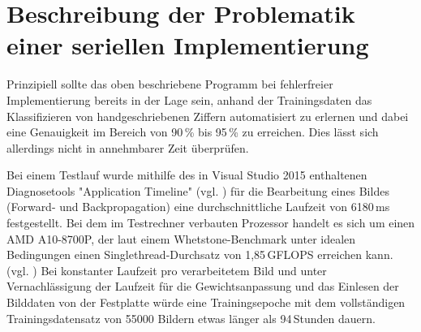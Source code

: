 \documentclass[../main.tex]{subfiles}
\begin{document}
\section{Beschreibung der Problematik einer seriellen Implementierung}
Prinzipiell sollte das oben beschriebene Programm bei fehlerfreier Implementierung bereits in der Lage sein, anhand der Trainingsdaten das Klassifizieren von handgeschriebenen Ziffern automatisiert zu erlernen und dabei eine Genauigkeit im Bereich von 90\,\% bis 95\,\% zu erreichen. Dies lässt sich allerdings nicht in annehmbarer Zeit überprüfen. 

Bei einem Testlauf wurde mithilfe des in Visual Studio 2015 enthaltenen Diagnosetools "Application Timeline" (vgl. \cite{msVsDiagnosisBlog}) für die Bearbeitung eines Bildes (Forward- und Backpropagation) eine durchschnittliche Laufzeit von 6180\,ms festgestellt. Bei dem im Testrechner verbauten Prozessor handelt es sich um einen AMD A10-8700P, der laut einem Whetstone-Benchmark unter idealen Bedingungen einen Singlethread-Durchsatz von 1,85\,GFLOPS erreichen kann. (vgl. \cite{cpuSinglethreadBenchmark}) Bei konstanter Laufzeit pro verarbeitetem Bild und unter Vernachlässigung der Laufzeit für die Gewichtsanpassung und das Einlesen der Bilddaten von der Festplatte würde eine Trainingsepoche mit dem vollständigen Trainingsdatensatz von 55000 Bildern etwas länger als 94\,Stunden dauern. 
\end{document}
